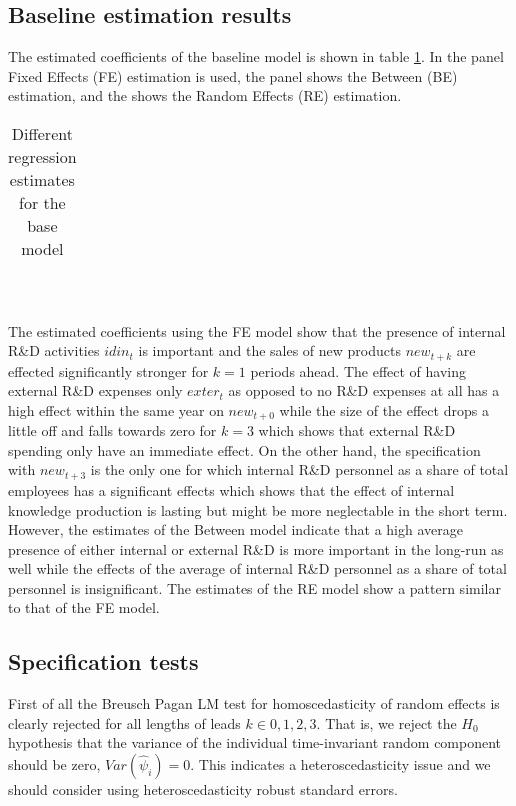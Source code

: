 \label{sec:results}
\subsection{Baseline estimation results}
\label{subsec:baseline}
The estimated coefficients of the baseline model is shown in table \ref{tab:base}. In the  panel Fixed Effects (FE) estimation is used, the  panel shows the Between (BE) estimation, and the  shows the Random Effects (RE) estimation.
\begin{table}[H]
  \centering
  \caption{Different regression estimates for the base model}
  \footnotesize
    \begin{tabular}{lcccc}
    \toprule
        
        
        
    \end{tabular}
    \\ 
  \label{tab:base}
\end{table}
The estimated coefficients using the FE model show that the presence of internal R\&D activities $idin_t$ is important and the sales of new products $new_{t+k}$ are effected significantly stronger for $k=1$ periods ahead. The effect of having external R\&D expenses only $exter_t$ as opposed to no R\&D expenses at all has a high effect within the same year on $new_{t+0}$ while the size of the effect drops a little off and falls towards zero for $k=3$ which shows that external R\&D spending only have an immediate effect. On the other hand, the specification with $new_{t+3}$ is the only one for which internal R\&D personnel as a share of total employees has a significant  effects which shows that the effect of internal knowledge production is lasting but might be more neglectable in the short term. However, the estimates of the Between model indicate that a high average presence of either internal or external R\&D is more important in the long-run as well
while the effects of the average of internal R\&D personnel as a share of total personnel is insignificant. The estimates of the RE model show a pattern similar to that of the FE model.

\subsection{Specification tests}
\label{subsec:tests}
First of all the Breusch Pagan LM test for homoscedasticity of random effects is clearly rejected for all lengths of leads $k\in0,1,2,3$. That is, we reject the $H_0$ hypothesis that the variance of the individual time-invariant random component should be zero, $Var(\hat{\psi}_i)=0$. This indicates a heteroscedasticity issue and we should consider using heteroscedasticity robust standard errors.

